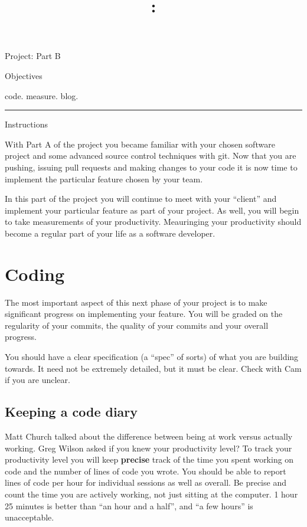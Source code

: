 \documentclass[letterpaper]{article}
\title{\course{}: \activity{}}
\date{}
\newcommand{\activity}{Project: Part B}
\newcommand{\horizrule}{\noindent\rule{\linewidth}{0.15mm}}
\begin{document}
\reversemarginpar

\begin{center}
  \Large{\activity{}}
\end{center}

\begin{center}
  \large{Objectives}
\end{center}

\begin{center}
code. measure. blog.
\end{center}

\horizrule

\begin{center}
  \large{Instructions}
\end{center}

With Part A of the project you became familiar with your chosen software project and some advanced source
control techniques with git. Now that you are pushing, issuing pull requests and making changes to your code
it is now time to implement the particular feature chosen by your team.

In this part of the project you will continue to meet with your ``client'' and implement your particular
feature as part of your project.  As well, you will begin to take measurements of your productivity.  Meauringing your productivity should become a regular part of your life as a software developer.

\section{Coding}

The most important aspect of this next phase of your project is to make significant progress on implementing
your feature. You will be graded on the regularity of your commits, the quality of your commits and your
overall progress.

You should have a clear specification (a ``spec'' of sorts) of what you are building towards.  It need not be extremely detailed, but it must be clear.  Check with Cam if you are unclear.

\subsection{Keeping a code diary}

Matt Church talked about the difference between being at work versus actually
working.  Greg Wilson asked if you knew your productivity level?  To track your productivity level you will keep {\bf precise} track of the time you spent working on code and the number of lines of code you wrote.  You should be able to report lines of code per hour for individual sessions as well as overall.  Be precise and count the time you are actively working, not just sitting at the computer.  1 hour 25 minutes is better than ``an hour and a half'', and ``a few hours'' is unacceptable. 
\end{document}
